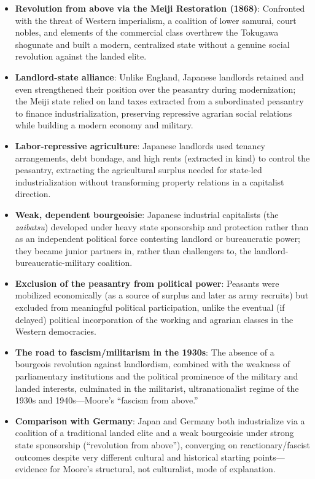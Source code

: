 \documentclass[12pt]{article}
\begin{document}
\begin{itemize}[leftmargin=*, itemsep=4pt]
    \item \textbf{Revolution from above via the Meiji Restoration (1868)}: Confronted with the threat of Western imperialism, a coalition of lower samurai, court nobles, and elements of the commercial class overthrew the Tokugawa shogunate and built a modern, centralized state without a genuine social revolution against the landed elite.
    \item \textbf{Landlord-state alliance}: Unlike England, Japanese landlords retained and even strengthened their position over the peasantry during modernization; the Meiji state relied on land taxes extracted from a subordinated peasantry to finance industrialization, preserving repressive agrarian social relations while building a modern economy and military.
    \item \textbf{Labor-repressive agriculture}: Japanese landlords used tenancy arrangements, debt bondage, and high rents (extracted in kind) to control the peasantry, extracting the agricultural surplus needed for state-led industrialization without transforming property relations in a capitalist direction.
    \item \textbf{Weak, dependent bourgeoisie}: Japanese industrial capitalists (the \textit{zaibatsu}) developed under heavy state sponsorship and protection rather than as an independent political force contesting landlord or bureaucratic power; they became junior partners in, rather than challengers to, the landlord-bureaucratic-military coalition.
    \item \textbf{Exclusion of the peasantry from political power}: Peasants were mobilized economically (as a source of surplus and later as army recruits) but excluded from meaningful political participation, unlike the eventual (if delayed) political incorporation of the working and agrarian classes in the Western democracies.
    \item \textbf{The road to fascism/militarism in the 1930s}: The absence of a bourgeois revolution against landlordism, combined with the weakness of parliamentary institutions and the political prominence of the military and landed interests, culminated in the militarist, ultranationalist regime of the 1930s and 1940s---Moore's ``fascism from above.''
    \item \textbf{Comparison with Germany}: Japan and Germany both industrialize via a coalition of a traditional landed elite and a weak bourgeoisie under strong state sponsorship (``revolution from above''), converging on reactionary/fascist outcomes despite very different cultural and historical starting points---evidence for Moore's structural, not culturalist, mode of explanation.
\end{itemize}
\end{document}
